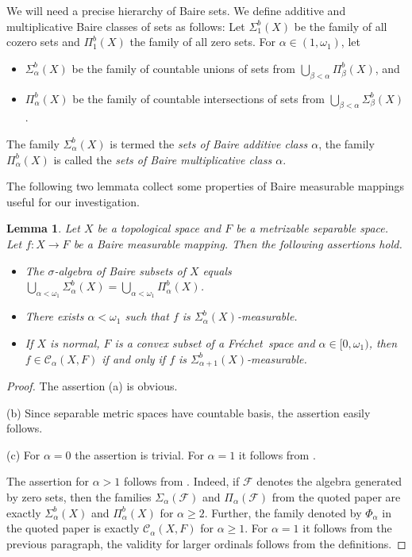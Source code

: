 \documentclass{amsart}
\numberwithin{equation}{section}
\newtheorem{lemma}[thm]{Lemma}
\theoremstyle{definition}
\def\C{\mathcal C}
\def\F{\mathcal F}
\def\en{\mathbb N}
\def \Baire {\operatorname{Balg}}
\newcommand{\fr}{Fr\'echet\ }
\begin{document}
We will need a precise hierarchy of Baire sets.
We define additive and multiplicative Baire classes of sets as follows:
Let $\Sigma_1^b(X)$ be the family of all cozero sets and $\Pi_1^b(X)$ the family of all zero sets. For $\alpha\in (1,\omega_1)$, let
\begin{itemize}
	\item $\Sigma_\alpha^b(X)$ be the family of countable unions of sets from $\bigcup_{\beta<\alpha}\Pi_\beta^b(X)$, and
	\item $\Pi_\alpha^b(X)$ be the family of countable intersections of sets from $\bigcup_{\beta<\alpha}\Sigma_\beta^b(X)$.
\end{itemize}
The family $\Sigma_\alpha^b(X)$ is termed the \emph{sets of Baire additive class $\alpha$},
the family $\Pi_\alpha^b(X)$ is called the \emph{sets of Baire multiplicative class $\alpha$}.

The following two lemmata collect some properties of Baire measurable mappings useful for our investigation.

\begin{lemma}\label{L:baire-n}
Let $X$ be a topological space and $F$ be a metrizable separable space. Let $f\colon X\to F$ be a Baire measurable mapping. Then the following assertions hold.
\begin{itemize}
	 \item [(a)] The $\sigma$-algebra of Baire subsets of $X$ equals $\bigcup_{\alpha<\omega_1} \Sigma_\alpha^b(X)=\bigcup_{\alpha<\omega_1}\Pi_\alpha^b(X)$.
	 \item [(b)] There exists $\alpha<\omega_1$ such that $f$ is $\Sigma_\alpha^b(X)$-measurable.
	 \item [(c)] If $X$ is normal, $F$ is a convex subset of a \fr space and $\alpha\in [0,\omega_1)$, then $f\in\C_\alpha(X,F)$ if and only if $f$ is $\Sigma_{\alpha+1}^b(X)$-measurable.
\end{itemize}
\end{lemma}

\begin{proof} The assertion (a) is obvious.

(b) Since separable metric spaces have countable basis, the assertion easily follows.

(c) For $\alpha=0$ the assertion is trivial. For $\alpha=1$ it follows from \cite[Theorem 3.7(i)]{vesely}.

The assertion for $\alpha>1$ follows from \cite[Theorem 2.7]{spurny-amh}. Indeed, if $\F$ denotes the algebra generated by zero sets, then the families $\Sigma_\alpha(\F)$ and $\Pi_\alpha(\F)$ from the quoted paper are exactly $\Sigma_\alpha^b(X)$ and $\Pi_\alpha^b(X)$ for $\alpha\ge2$. Further, the family denoted by $\Phi_\alpha$ in the quoted paper is exactly $\C_\alpha(X,F)$
for $\alpha\ge1$. For $\alpha=1$ it follows from the previous paragraph, the validity for larger ordinals follows from the definitions.
\end{proof}
\end{document}
